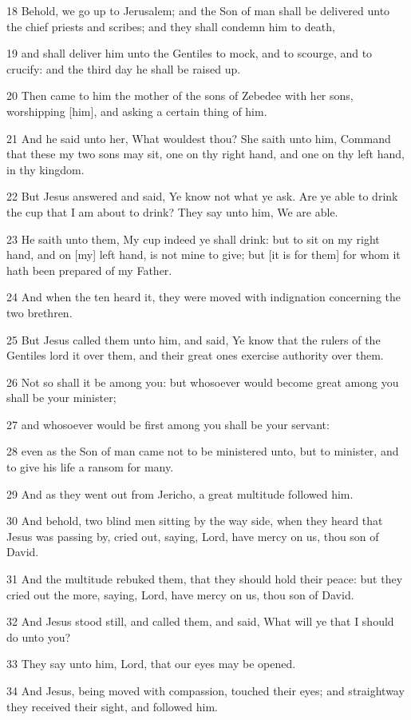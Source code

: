 \par 18 Behold, we go up to Jerusalem; and the Son of man shall be delivered unto the chief priests and scribes; and they shall condemn him to death,
\par 19 and shall deliver him unto the Gentiles to mock, and to scourge, and to crucify: and the third day he shall be raised up.
\par 20 Then came to him the mother of the sons of Zebedee with her sons, worshipping [him], and asking a certain thing of him.
\par 21 And he said unto her, What wouldest thou? She saith unto him, Command that these my two sons may sit, one on thy right hand, and one on thy left hand, in thy kingdom.
\par 22 But Jesus answered and said, Ye know not what ye ask. Are ye able to drink the cup that I am about to drink? They say unto him, We are able.
\par 23 He saith unto them, My cup indeed ye shall drink: but to sit on my right hand, and on [my] left hand, is not mine to give; but [it is for them] for whom it hath been prepared of my Father.
\par 24 And when the ten heard it, they were moved with indignation concerning the two brethren.
\par 25 But Jesus called them unto him, and said, Ye know that the rulers of the Gentiles lord it over them, and their great ones exercise authority over them.
\par 26 Not so shall it be among you: but whosoever would become great among you shall be your minister;
\par 27 and whosoever would be first among you shall be your servant:
\par 28 even as the Son of man came not to be ministered unto, but to minister, and to give his life a ransom for many.
\par 29 And as they went out from Jericho, a great multitude followed him.
\par 30 And behold, two blind men sitting by the way side, when they heard that Jesus was passing by, cried out, saying, Lord, have mercy on us, thou son of David.
\par 31 And the multitude rebuked them, that they should hold their peace: but they cried out the more, saying, Lord, have mercy on us, thou son of David.
\par 32 And Jesus stood still, and called them, and said, What will ye that I should do unto you?
\par 33 They say unto him, Lord, that our eyes may be opened.
\par 34 And Jesus, being moved with compassion, touched their eyes; and straightway they received their sight, and followed him.

